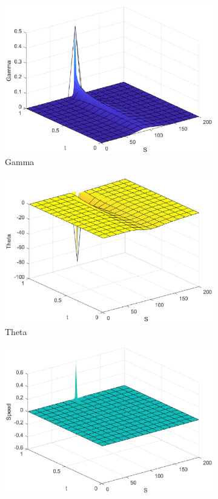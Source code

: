 \begin{figure}[H]
\begin{subfigure}[b]{0.35\linewidth}
        \includegraphics[width=\linewidth]{Imagenes/Parte1/6_Sols/Call/Call_Gamma.eps}
        \caption{Gamma}
    \end{subfigure}
    \begin{subfigure}[b]{0.35\linewidth}
        \includegraphics[width=\linewidth]{Imagenes/Parte1/6_Sols/Call/Call_Theta.eps}
        \caption{Theta}
    \end{subfigure}
    \begin{subfigure}[b]{0.35\linewidth}
        \includegraphics[width=\linewidth]{Imagenes/Parte1/6_Sols/Call/Call_Speed.eps}

\end{subfigure}
\end{figure}
